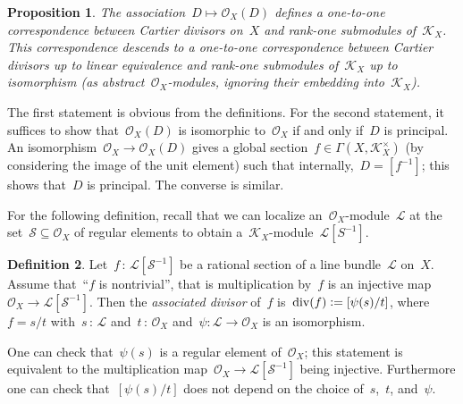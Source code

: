 \documentclass[10pt,reqno,a4paper]{amsbook}
\makeatletter
\theoremstyle{definition}
\newtheorem{defn}{Definition}[section]
\theoremstyle{plain}
\newtheorem{prop}[defn]{Proposition}
\theoremstyle{remark}
\newtheorem{rem}[defn]{Remark}
\renewcommand{\O}{\mathcal{O}}
\newcommand{\K}{\mathcal{K}}
\renewcommand{\L}{\mathcal{L}}
\renewcommand{\S}{\mathcal{S}}
\newcommand{\?}{\,{:}\,}
\renewcommand{\_}{\mathpunct{.}\,}
\newcommand{\defeq}{\vcentcolon=}
\renewenvironment{proof}[1][\proofname]{\par
  \pushQED{\qed}%
  \normalfont \topsep6\p@\@plus6\p@\relax
  \trivlist
  \item[\hskip\labelsep
        \itshape
    #1\@addpunct{.}]\ignorespaces
}{%
  \popQED\endtrivlist\@endpefalse
}
\makeatother
\begin{document}
\begin{prop}The association~$D \mapsto \O_X(D)$ defines a one-to-one
correspondence between Cartier divisors on~$X$ and rank-one submodules
of~$\K_X$. This correspondence descends to a one-to-one correspondence between
Cartier divisors up to linear equivalence and rank-one submodules of~$\K_X$ up
to isomorphism (as abstract~$\O_X$-modules, ignoring their embedding
into~$\K_X$).\end{prop}
\begin{proof}The first statement is obvious from the definitions. For the
second statement, it suffices to show that~$\O_X(D)$ is isomorphic to~$\O_X$ if
and only if~$D$ is principal. An isomorphism~$\O_X \to \O_X(D)$ gives a
global section~$f \in \Gamma(X,\K_X^\times)$ (by considering the image of the unit element)
such that internally,~$D = [f^{-1}]$; this shows that~$D$ is principal. The
converse is similar.
\end{proof}


For the following definition, recall that we can localize an~$\O_X$-module~$\L$
at the set~$\S \subseteq \O_X$ of regular elements to obtain
a~$\K_X$-module~$\L[S^{-1}]$.

\begin{defn}Let~$f\?\L[\S^{-1}]$ be a rational section of a line bundle~$\L$
on~$X$. Assume that~``$f$ is nontrivial'', that is multiplication by~$f$ is an
injective map~$\O_X \to \L[\S^{-1}]$. Then the \emph{associated divisor} of~$f$
is~$\operatorname{div}(f) \defeq [\psi(s)/t]$, where~$f = s/t$ with~$s\?\L$ and~$t\?\O_X$
and~$\psi : \L \to \O_X$ is an isomorphism.\end{defn}

One can check that~$\psi(s)$ is a regular element of~$\O_X$; this statement is
equivalent to the multiplication map~$\O_X \to \L[\S^{-1}]$ being
injective. Furthermore one can check that~$[\psi(s)/t]$ does not depend on the
choice of~$s$,~$t$, and~$\psi$.
\end{document}
